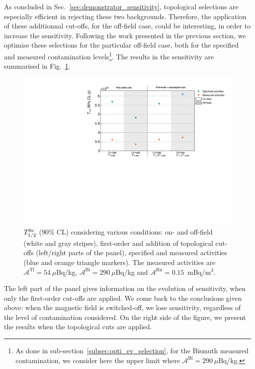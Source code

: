 As concluded in Sec.~\ref{sec:demonstrator_sensitivity}, topological selections are especially efficient in rejecting these two backgrounds.
Therefore, the application of these additionnal cut-offs, for the off-field case, could be interesting, in order to increase the sensitivity.
Following the work presented in the previous section, we optimise these selections for the particular off-field case, both for the specified and measured contamination levels\footnote{As done in sub-section~\ref{subsec:opti_ev_selection}, for the Bismuth measured contamination, we consider here the upper limit where $\mathcal{A}^{\text{Bi}}=290~\mu$Bq/kg.}.
The results in the sensitivity are summarised in Fig.~\ref{fig:sensitivity_B}.
\begin{figure}[h!]
  \centering
  \includegraphics[width=1.1\textwidth]{Sensitivity/fig_sensitivity/contamination_Se_w_woB.pdf}
  \caption{$T_{1/2}^{0\nu}$ ($90$\% CL) considering various conditions: on- and off-field (white and gray stripes), first-order and addition of topological cut-offs (left/right parts of the panel), specified and measured activities (blue and orange triangle markers).
    The measured activities are $\mathcal{A}^{\text{Tl}}=54~\mu$Bq/kg, $\mathcal{A}^{\text{Bi}}=290~\mu$Bq/kg and $\mathcal{A}^{\text{Rn}} = 0.15$~mBq/m$^{3}$.
    \label{fig:sensitivity_B}}
\end{figure}
The left part of the panel gives information on the evolution of sensitivity, when only the first-order cut-offs are applied.
We come back to the conclusions given above: when the magnetic field is switched-off, we lose sensitivity, regardless of the level of contamination considered.
On the right side of the figure, we present the results when the topological cuts are applied.
